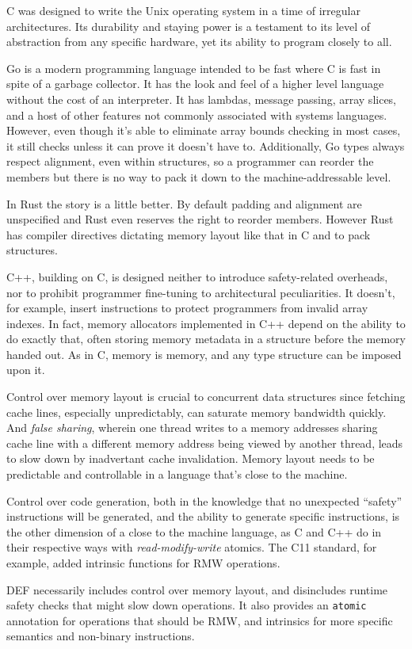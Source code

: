 C was designed to write the Unix operating system in a time of irregular architectures.  Its durability and staying power is a testament to its level of abstraction from any specific hardware, yet its ability to program closely to all.

Go is a modern programming language intended to be fast where C is fast in spite of a garbage collector.\cite{Go}  It has the look and feel of a higher level language without the cost of an interpreter.  It has lambdas, message passing, array slices, and a host of other features not commonly associated with systems languages.  However, even though it's able to eliminate array bounds checking in most cases, it still checks unless it can prove it doesn't have to.  Additionally, Go types always respect alignment, even within structures, so a programmer can reorder the members but there is no way to pack it down to the machine-addressable level.

In Rust the story is a little better. By default padding and alignment are unspecified and Rust even reserves the right to reorder members. However Rust has compiler directives dictating memory layout like that in C and to pack structures.

C++, building on C, is designed neither to introduce safety-related overheads, nor to prohibit programmer fine-tuning to architectural peculiarities.  It doesn't, for example, insert instructions to protect programmers from invalid array indexes.  In fact, memory allocators implemented in C++ depend on the ability to do exactly that, often storing memory metadata in a structure before the memory handed out.\cite{Hoard, TCMalloc, Supermalloc}  As in C, memory is memory, and any type structure can be imposed upon it.

Control over memory layout is crucial to concurrent data structures since fetching cache lines, especially unpredictably, can saturate memory bandwidth quickly.  And \textit{false sharing}, wherein one thread writes to a memory addresses sharing cache line with a different memory address being viewed by another thread, leads to slow down by inadvertant cache invalidation.  Memory layout needs to be predictable and controllable in a language that's close to the machine.

Control over code generation, both in the knowledge that no unexpected ``safety'' instructions will be generated, and the ability to generate specific instructions, is the other dimension of a close to the machine language, as C and C++ do in their respective ways with \textit{read-modify-write} atomics.  The C11 standard, for example, added intrinsic functions for RMW operations.\cite{C11Atomics}

DEF necessarily includes control over memory layout, and disincludes runtime safety checks that might slow down operations.  It also provides an \texttt{atomic} annotation for operations that should be RMW, and intrinsics for more specific semantics and non-binary instructions.
